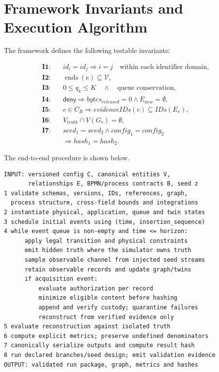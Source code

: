 ﻿\documentclass[10pt,a4paper,twocolumn]{article}
\begin{document}
\section{Framework Invariants and Execution Algorithm}

The framework defines the following testable invariants:

\begin{align}
\textbf{I1:}&\quad id_i=id_j\Rightarrow i=j \quad\text{within each identifier domain},\\
\textbf{I2:}&\quad \operatorname{ends}(e)\subseteq\mathcal{V},\\
\textbf{I3:}&\quad 0\le q_k\le K\quad\land\quad\text{queue conservation},\\
\textbf{I4:}&\quad \mathsf{deny}\Rightarrow bytes_{released}=0\land E_{new}=\emptyset,\\
\textbf{I5:}&\quad c\in C_R\Rightarrow evidenceIDs(c)\subseteq IDs(E_v),\\
\textbf{I6:}&\quad V_{truth}\cap V(G_r)=\emptyset,\\
\textbf{I7:}&\quad seed_1=seed_2\land config_1=config_2\\
&\quad\Rightarrow hash_1=hash_2.
\end{align}

The end-to-end procedure is shown below.

\begin{lstlisting}[language={},caption={Framework execution procedure.}]
INPUT: versioned config C, canonical entities V,
       relationships E, BPMN/process contracts B, seed z
1 validate schemas, versions, IDs, references, graph,
  process structure, cross-field bounds and integrations
2 instantiate physical, application, queue and twin states
3 schedule initial events using (time, insertion_sequence)
4 while event queue is non-empty and time <= horizon:
      apply legal transition and physical constraints
      emit hidden truth where the simulator owns truth
      sample observable channel from injected seed streams
      retain observable records and update graph/twins
      if acquisition event:
          evaluate authorization per record
          minimize eligible content before hashing
          append and verify custody; quarantine failures
          reconstruct from verified evidence only
5 evaluate reconstruction against isolated truth
6 compute explicit metrics; preserve undefined denominators
7 canonically serialize outputs and compute result hash
8 run declared branches/seed design; emit validation evidence
OUTPUT: validated run package, graph, metrics and hashes
\end{lstlisting}
\end{document}
